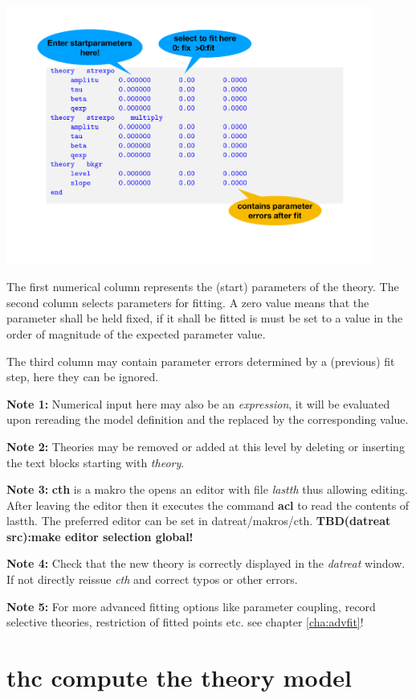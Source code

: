 \documentclass[11pt,fleqn]{book} %
\newcommand{\linespace}{\vspace{4ex}}
\newcommand{\tbd}[1]{\vskip 0.5cm {\bf {\color{green} TBD(datreat src):#1 }} \vskip 0.5cm}
\newcommand{\desc}[1]{\hskip 0.5cm {\color{descgray} #1}}
\begin{document}
\includegraphics[width=0.9\textwidth]{thparexplan1.pdf}

The first numerical column represents the (start) parameters of the theory. The second column
selects parameters for fitting. A zero value means that the parameter shall be held fixed, if it shall
be fitted is must be set to a value in the order of magnitude of the expected parameter value.

The third column may contain parameter errors determined by a (previous) fit step, here they can
be ignored.
\linespace

{\bf Note 1:} Numerical input here may also be an {\it expression}, it will be evaluated upon rereading the
model definition and the replaced by the corresponding value.
\linespace

{\bf Note 2:} Theories may be removed or added at this level by deleting or inserting the text blocks
starting with \emph{theory}.
\linespace

{\bf Note 3:} {\bf cth} is a makro the opens an editor with file \emph{lastth} thus allowing editing. After
leaving the editor then it executes the command {\bf acl} to read the contents of lastth.
The preferred editor can be set in datreat/makros/cth. \tbd{make editor selection global!}
\linespace

{\bf Note 4:} Check that the new theory is correctly displayed in the \emph{datreat} window. If not 
directly reissue {\it cth} and correct typos or other errors.
\linespace

{\bf Note 5:} For more advanced fitting options like parameter coupling, record selective theories,
restriction of fitted points etc. see chapter \ref{cha:advfit}!

\section{thc \desc{compute the theory model}}
\label{sec:thc}
%
\end{document}
